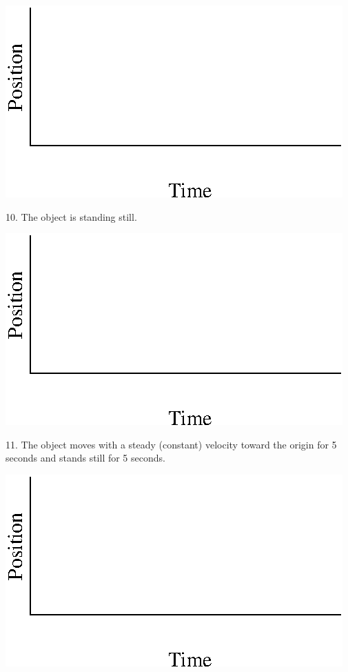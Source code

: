 \vspace{0.3cm}
{\par\centering \includegraphics{position/position_fig13.eps} \par}
\vspace{0.3cm}

10. The object is standing still.

\vspace{0.3cm}
{\par\centering \includegraphics{position/position_fig13.eps} \par}
\vspace{0.3cm}

11. The object moves with a steady (constant) velocity toward the origin for
5 seconds and stands still for 5 seconds.

\vspace{0.3cm}
{\par\centering \includegraphics{position/position_fig13.eps} \par}
\vspace{0.3cm}

